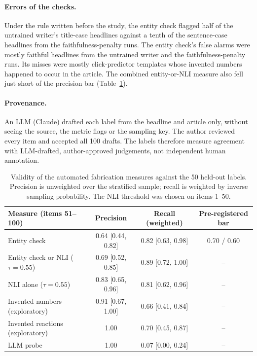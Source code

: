 \documentclass[11pt]{article}
\begin{document}
\paragraph{Errors of the checks.} Under the rule written before the study, the entity check flagged half of the untrained writer's title-case headlines against a tenth of the sentence-case headlines from the faithfulness-penalty runs. The entity check's false alarms were mostly faithful headlines from the untrained writer and the faithfulness-penalty runs. Its misses were mostly click-predictor templates whose invented numbers happened to occur in the article. The combined entity-or-NLI measure also fell just short of the precision bar (Table~\ref{tab:m1}).
\paragraph{Provenance.} An LLM (Claude) drafted each label from the headline and article only, without seeing the source, the metric flags or the sampling key. The author reviewed every item and accepted all 100 drafts. The labels therefore measure agreement with LLM-drafted, author-approved judgements, not independent human annotation.

\begin{table}[h]
\centering\small
\begin{tabular}{@{}lccc@{}}
\toprule
Measure (items 51--100) & Precision & Recall (weighted) & Pre-registered bar \\
\midrule
Entity check & 0.64 [0.44, 0.82] & 0.82 [0.63, 0.98] & 0.70 / 0.60 \\
Entity check or NLI ($\tau=0.55$) & 0.69 [0.52, 0.85] & 0.89 [0.72, 1.00] & -- \\
NLI alone ($\tau=0.55$) & 0.83 [0.65, 0.96] & 0.81 [0.62, 0.96] & -- \\
Invented numbers (exploratory) & 0.91 [0.67, 1.00] & 0.66 [0.41, 0.84] & -- \\
Invented reactions (exploratory) & 1.00 & 0.70 [0.45, 0.87] & -- \\
LLM probe & 1.00 & 0.07 [0.00, 0.24] & -- \\
\bottomrule
\end{tabular}
\caption{Validity of the automated fabrication measures against the 50 held-out labels. Precision is unweighted over the stratified sample; recall is weighted by inverse sampling probability. The NLI threshold was chosen on items 1--50.}
\label{tab:m1}
\end{table}
\end{document}
